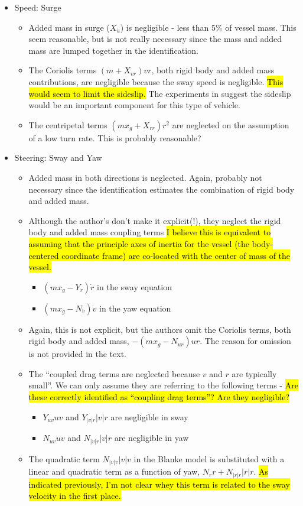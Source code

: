 \documentclass[11pt,draftcls,journal,onecolumn]{IEEEtran}
\begin{document}
\begin{itemize}
\item Speed: Surge
  \begin{itemize}
  \item Added mass in surge ($X_{\dot{u}}$) is negligible - less than 5\% of vessel mass.  This seem reasonable, but is not really necessary since the mass and added mass are lumped together in the identification.
  \item The Coriolis terms $(m+X_{vr})vr$, both rigid body and added mass contributions, are negligible because the sway speed is negligible.  \hl{This would seem to limit the sideslip.}  The experiments in \cite{sonnenburg10control}suggest the sideslip would be an important component for this type of vehicle.
  \item The centripetal terms $(mx_g+X_{rr})r^2$ are neglected on the assumption of a low turn rate.  This is probably reasonable?
  \end{itemize}
\item Steering: Sway and Yaw
  \begin{itemize}
  \item Added mass in both directions is neglected.  Again, probably not necessary since the identification estimates the combination of rigid body and added mass.
  \item Although the author's don't make it explicit(!), they neglect the rigid body and added mass coupling terms  \hl{I believe this is equivalent to assuming that the principle axes of inertia for the vessel (the body-centered coordinate frame) are co-located with the center of mass of the vessel.}
    \begin{itemize}
    \item $(m x_g - Y_{\dot{r}})\dot{r}$ in the sway equation
    \item $(m x_g - N_{\dot{v}})\dot{v}$ in the yaw equation
    \end{itemize}
  \item Again, this is not explicit, but the authors omit the Coriolis terms, both rigid body and added mass, $-(mx_g-N_{ur})ur$. The reason for omission is not provided in the text.
  \item The ``coupled drag terms are neglected because $v$ and $r$ are typically small''.  We can only assume they are referring to the following terms - \hl{Are these correctly identified as ``coupling drag terms''?  Are they negligible?}
    \begin{itemize}
    \item $Y_{uv}uv$ and $Y_{|v|r}|v|r$ are negligible in sway
    \item $N_{uv}uv$ and $N_{|v|r}|v|r$ are negligible in yaw
    \end{itemize}
   \item The quadratic term $N_{|v|v}|v|v$ in the Blanke model is substituted with a linear and quadratic term as a function of yaw, $N_r r+N_{|r|r}|r|r$. \hl{As indicated previously, I'm not clear whey this term is related to the sway velocity in the first place.}
  \end{itemize}
\end{itemize}
\end{document}
